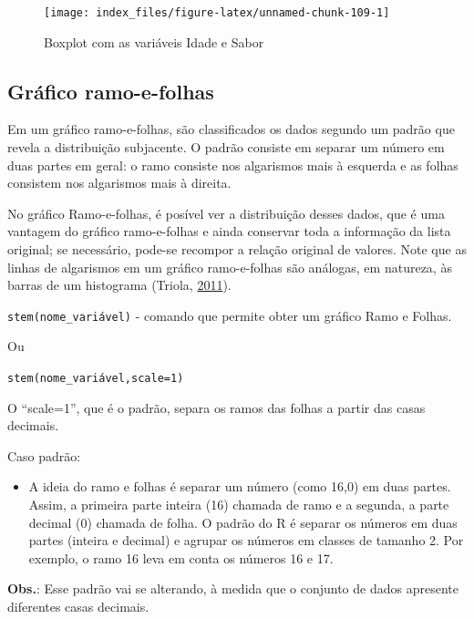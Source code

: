 \documentclass[12pt,brazil,oneside]{book}
\providecommand{\tightlist}{%
  \setlength{\itemsep}{0pt}\setlength{\parskip}{0pt}}
\begin{document}
\begin{figure}[H]

{\centering \texttt{[image: index\_files/figure-latex/unnamed-chunk-109-1]} 

}

\caption{Boxplot com as variáveis Idade e Sabor}\label{fig:unnamed-chunk-109}
\end{figure}

\hypertarget{grafico-ramo-e-folhas}{%
\subsection{Gráfico ramo-e-folhas}\label{grafico-ramo-e-folhas}}

Em um gráfico ramo-e-folhas, são classificados os dados segundo um padrão que revela a distribuição subjacente. O padrão consiste em separar um número em duas partes em geral: o ramo consiste nos algarismos mais à esquerda e as folhas consistem nos algarismos mais à direita.

No gráfico Ramo-e-folhas, é posível ver a distribuição desses dados, que é uma vantagem do gráfico ramo-e-folhas e ainda conservar toda a informação da lista original; se necessário, pode-se recompor a relação original de valores. Note que as linhas de algarismos em um gráfico ramo-e-folhas são análogas, em natureza, às barras de um histograma (Triola, \protect\hyperlink{ref-triola1999}{2011}).

\texttt{stem(nome\_variável)} - comando que permite obter um gráfico Ramo e Folhas.

Ou

\texttt{stem(nome\_variável,scale=1)}

O ``scale=1'', que é o padrão, separa os ramos das folhas a partir das casas decimais.

Caso padrão:

\begin{itemize}
\tightlist
\item
  A ideia do ramo e folhas é separar um número (como 16,0) em duas partes. Assim, a primeira parte inteira (16) chamada de ramo e a segunda, a parte decimal (0) chamada de folha. O padrão do R é separar os números em duas partes (inteira e decimal) e agrupar os números em classes de tamanho 2. Por exemplo, o ramo 16 leva em conta os números 16 e 17.
\end{itemize}

\textbf{Obs.}: Esse padrão vai se alterando, à medida que o conjunto de dados apresente diferentes casas decimais.
\end{document}
